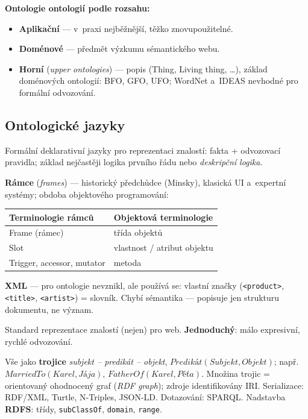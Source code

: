 \documentclass[11pt,a4paper]{article}
\theoremstyle{definition}
\begin{document}
\textbf{Ontologie ontologií podle rozsahu:}
\begin{itemize}
\item \textbf{Aplikační} --- v~praxi nejběžnější, těžko znovupoužitelné.
\item \textbf{Doménové} --- předmět výzkumu sémantického webu.
\item \textbf{Horní} (\emph{upper ontologies}) --- popis  (Thing, Living thing, \dots),
  základ doménových ontologií: BFO, GFO, UFO; WordNet a~IDEAS nevhodné pro formální odvozování.
\end{itemize}

\subsection{Ontologické jazyky}

Formální deklarativní jazyky pro reprezentaci znalostí: fakta + odvozovací pravidla; základ
nejčastěji logika prvního řádu nebo \emph{deskripční logika}.

\textbf{Rámce} (\emph{frames}) --- historický předchůdce (Minsky), klasická UI a~expertní
systémy; obdoba objektového programování:

\begin{center}\small
\begin{tabular}{ll}
\toprule
\textbf{Terminologie rámců} & \textbf{Objektová terminologie} \\
\midrule
Frame (rámec) & třída objektů \\
Slot & vlastnost / atribut objektu \\
Trigger, accessor, mutator & metoda \\
\bottomrule
\end{tabular}
\end{center}

\textbf{XML} --- pro ontologie nevznikl, ale používá se: vlastní značky
(\texttt{<product>}, \texttt{<title>}, \texttt{<artist>}) = slovník. Chybí sémantika ---
popisuje jen strukturu dokumentu, ne význam.

\begin{defbox}
Standard reprezentace znalostí (nejen) pro web. \textbf{Jednoduchý}: málo expresivní, rychlé
odvozování.

Vše jako \textbf{trojice} \emph{subjekt -- predikát -- objekt},
$\mathit{Predikát}(\mathit{Subjekt},\mathit{Objekt})$; např.\
$\mathit{MarriedTo}(\mathit{Karel},\mathit{Jája})$,
$\mathit{FatherOf}(\mathit{Karel},\mathit{Péťa})$.
Množina trojic = orientovaný ohodnocený graf (\emph{RDF graph}); zdroje identifikovány IRI.
Serializace: RDF/XML, Turtle, N-Triples, JSON-LD. Dotazování: SPARQL.
Nadstavba \textbf{RDFS}: třídy, \texttt{subClassOf}, \texttt{domain}, \texttt{range}.
\end{defbox}
\end{document}

